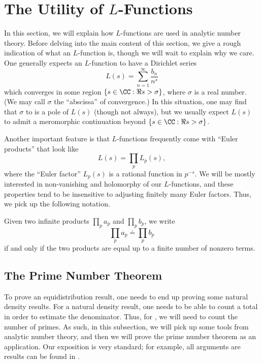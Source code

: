 \documentclass[../thesis.tex]{subfiles}
\begin{document}
\section{The Utility of \texorpdfstring{$L$-Functions}{ L-Functions}}
In this section, we will explain how $L$-functions are used in analytic number theory. Before delving into the main content of this section, we give a rough indication of what an $L$-function is, though we will wait to explain why we care. One generally expects an $L$-function to have a Dirichlet series
\[L(s)=\sum_{n=1}^\infty\frac{b_n}{n^s}\]
which converges in some region $\{s\in\CC:\Re s>\sigma\}$, where $\sigma$ is a real number. (We may call $\sigma$ the ``abscissa'' of convergence.) In this situation, one may find that $\sigma$ to is a pole of $L(s)$ (though not always), but we usually expect $L(s)$ to admit a meromorphic continuation beyond $\{s\in\CC:\Re s>\sigma\}$.

Another important feature is that $L$-functions frequently come with ``Euler products'' that look like
\[L(s)=\prod_pL_p(s),\]
where the ``Euler factor'' $L_p(s)$ is a rational function in $p^{-s}$. We will be mostly interested in non-vanishing and holomorphy of our $L$-functions, and these properties tend to be insensitive to adjusting finitely many Euler factors. Thus, we pick up the following notation.
\begin{notation}
	Given two infinite products $\prod_{p}a_p$ and $\prod_pb_p$, we write
	\[\prod_pa_p\doteq\prod_pb_p\]
	if and only if the two products are equal up to a finite number of nonzero terms.
\end{notation}

\subsection{The Prime Number Theorem}
To prove an equidistribution result, one needs to end up proving some natural density results. For a natural density result, one needs to be able to count a total in order to estimate the denominator. Thus, for , we will need to count the number of primes. As such, in this subsection, we will pick up some tools from analytic number theory, and then we will prove the prime number theorem as an application. Our exposition is very standard; for example, all arguments are results can be found in \cite[Chapter~3]{murty-analytic-nt}.
\end{document}

